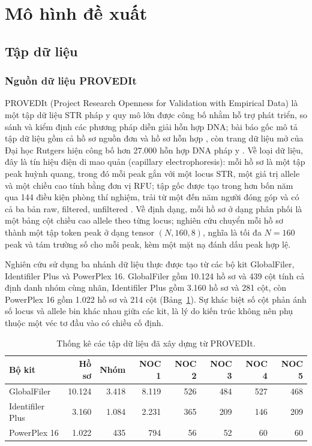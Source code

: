 \documentclass[12pt,a4paper]{article}
\begin{document}
\section{Mô hình đề xuất}

\subsection{Tập dữ liệu}

\subsubsection{Nguồn dữ liệu PROVEDIt}

PROVEDIt (Project Research Openness for Validation with Empirical Data) là một tập dữ liệu STR pháp y quy mô lớn được công bố nhằm hỗ trợ phát triển, so sánh và kiểm định các phương pháp diễn giải hỗn hợp DNA; bài báo gốc mô tả tập dữ liệu gồm cả hồ sơ nguồn đơn và hồ sơ hỗn hợp \cite{provedit2018}, còn trang dữ liệu mở của Đại học Rutgers hiện công bố hơn 27.000 hỗn hợp DNA pháp y \cite{proveditweb}. Về loại dữ liệu, đây là tín hiệu điện di mao quản (capillary electrophoresis): mỗi hồ sơ là một tập peak huỳnh quang, trong đó mỗi peak gắn với một locus STR, một giá trị allele và một chiều cao tính bằng đơn vị RFU; tập gốc được tạo trong hơn bốn năm qua 144 điều kiện phòng thí nghiệm, trải từ một đến năm người đóng góp và có cả ba bản raw, filtered, unfiltered \cite{alamoudi2022}. Về định dạng, mỗi hồ sơ ở dạng phân phối là một bảng cột chiều cao allele theo từng locus; nghiên cứu chuyển mỗi hồ sơ thành một tập token peak ở dạng tensor \((N,160,8)\), nghĩa là tối đa \(N=160\) peak và tám trường số cho mỗi peak, kèm một mặt nạ đánh dấu peak hợp lệ.

Nghiên cứu sử dụng ba nhánh dữ liệu thực được tạo từ các bộ kit GlobalFiler, Identifiler Plus và PowerPlex 16. GlobalFiler gồm 10.124 hồ sơ và 439 cột tính cả định danh nhóm cùng nhãn, Identifiler Plus gồm 3.160 hồ sơ và 281 cột, còn PowerPlex 16 gồm 1.022 hồ sơ và 214 cột (Bảng~\ref{tab:data_stats}). Sự khác biệt số cột phản ánh số locus và allele bin khác nhau giữa các kit, là lý do kiến trúc không nên phụ thuộc một véc tơ đầu vào có chiều cố định.

\begin{table}[H]
\centering
\caption{Thống kê các tập dữ liệu đã xây dựng từ PROVEDIt.}
\label{tab:data_stats}
\small
\begin{tabular}{lrrrrrrr}
\toprule
\textbf{Bộ kit} & \textbf{Hồ sơ} & \textbf{Nhóm} & \textbf{NOC 1} & \textbf{NOC 2} &
\textbf{NOC 3} & \textbf{NOC 4} & \textbf{NOC 5} \\
\midrule
GlobalFiler & 10.124 & 3.418 & 8.119 & 526 & 484 & 527 & 468 \\
Identifiler Plus & 3.160 & 1.084 & 2.231 & 365 & 209 & 146 & 209 \\
PowerPlex 16 & 1.022 & 435 & 794 & 56 & 52 & 60 & 60 \\
\bottomrule
\end{tabular}
\end{table}
\end{document}
